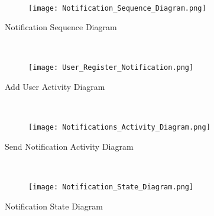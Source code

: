 \documentclass{article}
\begin{document}
    \mbox{}\\
    \bigskip
    \clearpage
    
    \begin{figure}[h!]
        \texttt{[image: Notification\_Sequence\_Diagram.png]}
    \end{figure}
    Notification Sequence Diagram
    
    \mbox{}\\
    \bigskip
    \clearpage
    
    \begin{figure}[h!]
        \texttt{[image: User\_Register\_Notification.png]}
    \end{figure}
    Add User Activity Diagram
    
    \mbox{}\\
    \bigskip
    \clearpage
    
    \begin{figure}[h!]
        \texttt{[image: Notifications\_Activity\_Diagram.png]}
    \end{figure}
    Send Notification Activity Diagram
    
    \mbox{}\\
    \bigskip
    \clearpage
    
    \begin{figure}[h!]
        \begin{center}
            \texttt{[image: Notification\_State\_Diagram.png]}
        \end{center}
    \end{figure}
    Notification State Diagram
    
    \mbox{}\\
\end{document}
